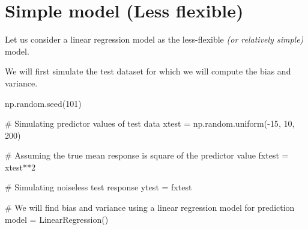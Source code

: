 \documentclass[
  letterpaper,
  DIV=11,
  numbers=noendperiod]{scrreprt}
\newenvironment{Shaded}{\begin{snugshade}}{\end{snugshade}}
\newcommand{\CommentTok}[1]{\textcolor[rgb]{0.37,0.37,0.37}{#1}}
\newcommand{\DecValTok}[1]{\textcolor[rgb]{0.68,0.00,0.00}{#1}}
\newcommand{\NormalTok}[1]{\textcolor[rgb]{0.00,0.23,0.31}{#1}}
\newcommand{\OperatorTok}[1]{\textcolor[rgb]{0.37,0.37,0.37}{#1}}
\begin{document}
\section{Simple model (Less flexible)}\label{simple-model-less-flexible}

Let us consider a linear regression model as the less-flexible \emph{(or
relatively simple)} model.

We will first simulate the test dataset for which we will compute the
bias and variance.

\begin{Shaded}
\begin{Highlighting}[]
\NormalTok{np.random.seed(}\DecValTok{101}\NormalTok{)}

\CommentTok{\# Simulating predictor values of test data}
\NormalTok{xtest }\OperatorTok{=}\NormalTok{ np.random.uniform(}\OperatorTok{{-}}\DecValTok{15}\NormalTok{, }\DecValTok{10}\NormalTok{, }\DecValTok{200}\NormalTok{)}

\CommentTok{\# Assuming the true mean response is square of the predictor value}
\NormalTok{fxtest }\OperatorTok{=}\NormalTok{ xtest}\OperatorTok{**}\DecValTok{2}

\CommentTok{\# Simulating noiseless test response }
\NormalTok{ytest }\OperatorTok{=}\NormalTok{ fxtest}

\CommentTok{\# We will find bias and variance using a linear regression model for prediction}
\NormalTok{model }\OperatorTok{=}\NormalTok{ LinearRegression()}
\end{Highlighting}
\end{Shaded}
\end{document}
